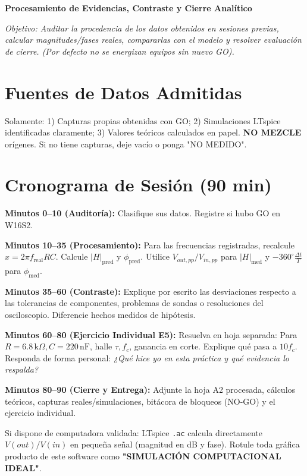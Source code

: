 \documentclass[11pt, a4paper]{article}
\begin{document}
\begin{tcolorbox}[colback=ucbblue!5!white, colframe=ucbblue, title=\textbf{Artefacto A5b: Guía Autónoma de Trabajo (W16S3 — 20/11/2026)}]
    \centering \textbf{Procesamiento de Evidencias, Contraste y Cierre Analítico}
\end{tcolorbox}

\noindent\textit{Objetivo: Auditar la procedencia de los datos obtenidos en sesiones previas, calcular magnitudes/fases reales, compararlas con el modelo y resolver evaluación de cierre. (Por defecto no se energizan equipos sin nuevo GO).}

\section*{Fuentes de Datos Admitidas}
Solamente: 1) Capturas propias obtenidas con GO; 2) Simulaciones LTspice identificadas claramente; 3) Valores teóricos calculados en papel. \textbf{NO MEZCLE} orígenes. Si no tiene capturas, deje vacío o ponga "NO MEDIDO".

\section*{Cronograma de Sesión (90 min)}
\textbf{Minutos 0–10 (Auditoría):} Clasifique sus datos. Registre si hubo GO en W16S2. \par
\textbf{Minutos 10–35 (Procesamiento):} Para las frecuencias registradas, recalcule $x = 2\pi f_{\text{real}} R C$. Calcule $|H|_{\text{pred}}$ y $\phi_{\text{pred}}$. Utilice $V_{out,pp} / V_{in,pp}$ para $|H|_{\text{med}}$ y $-360^\circ \frac{\Delta t}{T}$ para $\phi_{\text{med}}$. \par
\textbf{Minutos 35–60 (Contraste):} Explique por escrito las desviaciones respecto a las tolerancias de componentes, problemas de sondas o resoluciones del osciloscopio. Diferencie hechos medidos de hipótesis. \par
\textbf{Minutos 60–80 (Ejercicio Individual E5):} 
Resuelva en hoja separada: Para $R=6.8\,\text{k}\Omega, C=220\,\text{nF}$, halle $\tau, f_c$, ganancia en corte. Explique qué pasa a $10f_c$. Responda de forma personal: \textit{¿Qué hice yo en esta práctica y qué evidencia lo respalda?} \par
\textbf{Minutos 80–90 (Cierre y Entrega):} Adjunte la hoja A2 procesada, cálculos teóricos, capturas reales/simulaciones, bitácora de bloqueos (NO-GO) y el ejercicio individual.

\vspace{0.4cm}
\begin{tcolorbox}[colback=gray!5, colframe=black, title=\textbf{Nota Opcional de LTspice (\texttt{.ac})}]
\small Si dispone de computadora validada: LTspice \texttt{.ac} calcula directamente $V(out)/V(in)$ en pequeña señal (magnitud en dB y fase). Rotule toda gráfica producto de este software como \textbf{"SIMULACIÓN COMPUTACIONAL IDEAL"}.
\end{tcolorbox}
\end{document}
